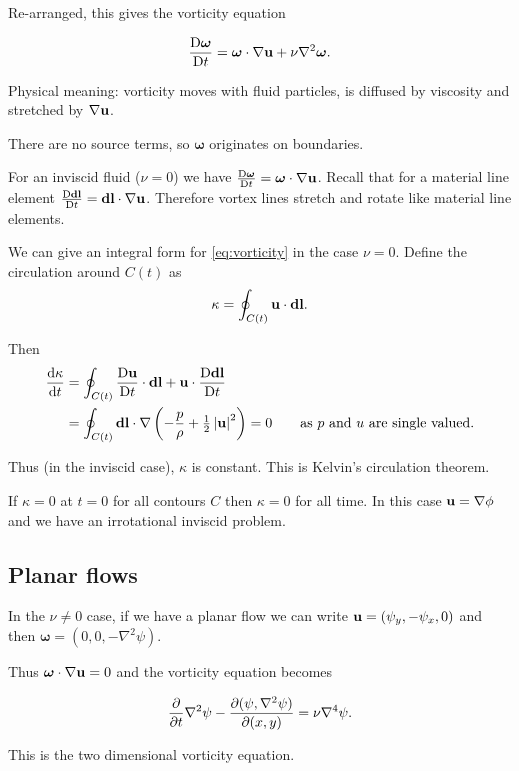 \documentclass{notes}
\newcommand{\om}{\boldsymbol{\omega}}
\theoremstyle{plain}
\begin{document}
Re-arranged, this gives the vorticity equation

\begin{equation}\label{eq:vorticity}
\DDt{\om} = \om \cdot \nabla \vu + \nu \nabla^2 \om.
\end{equation}

Physical meaning: vorticity moves with fluid particles, is diffused by
viscosity and stretched by $\nabla \mathbf{u}$.

There are no source terms, so $\om$ originates on boundaries.

For an inviscid fluid ($\nu = 0$) we have $\DDt{\om} = \om \cdot \nabla \vu$.
Recall that for a material line element $\frac{\mathrm{D}\mathbf{dl}}{\mathrm{D} t} = \mathbf{dl} \cdot
\nabla \mathbf{u}$.  Therefore vortex lines stretch and rotate like material line
elements.

We can give an integral form for \eqref{eq:vorticity} in the case
$\nu = 0$.  Define the circulation around $C(t)$ as
\[
\kappa = \oint_{C(t)} \mathbf{u} \cdot \mathbf{dl}.
\]

Then
\begin{align*}
\frac{\mathrm{d}\kappa}{\mathrm{d} t} &= \oint_{C(t)} \frac{\mathrm{D}\mathbf{u}}{\mathrm{D} t} \cdot \mathbf{dl}
+ \mathbf{u} \cdot \frac{\mathrm{D}\mathbf{dl}}{\mathrm{D} t} \\
&= \oint_{C(t)} \mathbf{dl} \cdot \nabla \left( - \frac{p}{\rho}
+ \tfrac{1}{2} \left|\mathbf{u}\right|^2 \right) = 0 \qquad \text{as $p$ and $u$ are single valued.}
\end{align*}

Thus (in the inviscid case), $\kappa$ is constant.  This is 
Kelvin's circulation theorem.

If $\kappa = 0$ at $t=0$ for all contours $C$ then $\kappa = 0$ for all
time. In this case $\mathbf{u} = \nabla \phi$ and we have an irrotational inviscid
problem.

\subsection{Planar flows}

In the $\nu \neq 0$ case, if we have a planar flow we can write
$\mathbf{u} = (\psi_y, - \psi_x, 0)$ and then $\om = (0,0,-\nabla^2 \psi)$.

Thus $\om \cdot \nabla \vu = 0$ and the vorticity equation becomes

\begin{equation}\label{eq:2dvort}
\frac{\partial }{\partial t} \nabla^2 \psi - \frac{\partial (\psi,\nabla^2 \psi)}{\partial (x,y)} = \nu \nabla^4 \psi.
\end{equation}

This is the two dimensional vorticity equation.
\end{document}
